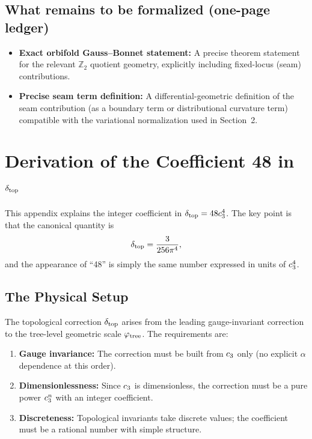 \subsection{What remains to be formalized (one-page ledger)}
\begin{itemize}[leftmargin=1.5em, topsep=2pt, itemsep=1pt]
    \item \textbf{Exact orbifold Gauss--Bonnet statement:} A precise theorem statement for the relevant $\mathbb{Z}_2$ quotient geometry, explicitly including fixed-locus (seam) contributions.
    \item \textbf{Precise seam term definition:} A differential-geometric definition of the seam contribution (as a boundary term or distributional curvature term) compatible with the variational normalization used in Section~2.
\end{itemize}

\section{Derivation of the Coefficient 48 in $\delta_{\mathrm{top}}$}
\label{app:48deriv}

This appendix explains the integer coefficient in $\delta_{\mathrm{top}} = 48c_3^4$.
The key point is that the canonical quantity is
\begin{equation}
    \delta_{\mathrm{top}} = \frac{3}{256\pi^4},
\end{equation}
and the appearance of ``48'' is simply the same number expressed in units of $c_3^4$.

\subsection{The Physical Setup}

The topological correction $\delta_{\mathrm{top}}$ arises from the leading gauge-invariant correction 
to the tree-level geometric scale $\varphi_{\mathrm{tree}}$. The requirements are:
\begin{enumerate}[leftmargin=1.5em, topsep=2pt, itemsep=1pt]
    \item \textbf{Gauge invariance:} The correction must be built from $c_3$ only 
        (no explicit $\alpha$ dependence at this order).
    \item \textbf{Dimensionlessness:} Since $c_3$ is dimensionless, the correction 
        must be a pure power $c_3^n$ with an integer coefficient.
    \item \textbf{Discreteness:} Topological invariants take discrete values; the 
        coefficient must be a rational number with simple structure.
\end{enumerate}

